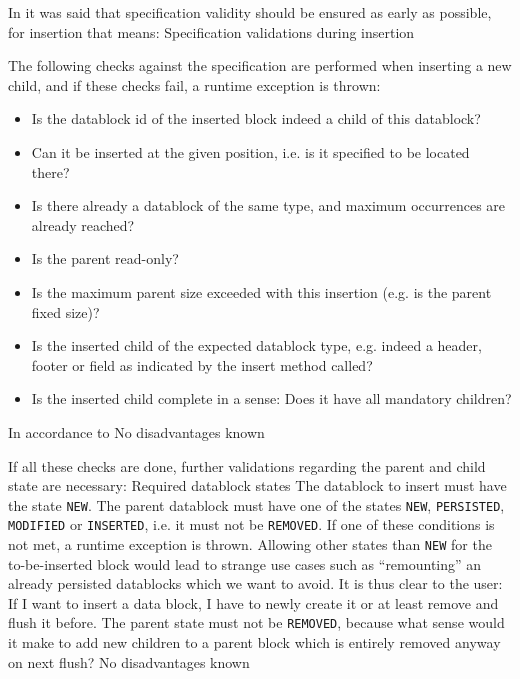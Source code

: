 In  it was said that specification validity should be ensured as early as possible, for insertion that means:
{%
Specification validations during insertion
}
{%
The following checks against the specification are performed when inserting a new child, and if these checks fail, a runtime exception is thrown:
\begin{itemize}
\item Is the datablock id of the inserted block indeed a child of this datablock?
\item Can it be inserted at the given position, i.e. is it specified to be located there?
\item Is there already a datablock of the same type, and maximum occurrences are already reached?
\item Is the parent read-only?
\item Is the maximum parent size exceeded with this insertion (e.g. is the parent fixed size)?
\item Is the inserted child of the expected datablock type, e.g. indeed a header, footer or field as indicated by the insert method called?
\item Is the inserted child complete in a sense: Does it have all mandatory children?
\end{itemize}
}
{%
In accordance to 
}
{%
No disadvantages known
}

If all these checks are done, further validations regarding the parent and child state are necessary:
{%
Required datablock states
}
{%
The datablock to insert must have the state \texttt{NEW}. The parent datablock must have one of the states \texttt{NEW}, \texttt{PERSISTED}, \texttt{MODIFIED} or \texttt{INSERTED}, i.e. it must not be \texttt{REMOVED}. If one of these conditions is not met, a runtime exception is thrown.
}
{%
Allowing other states than \texttt{NEW} for the to-be-inserted block would lead to strange use cases such as ``remounting'' an already persisted datablocks which we want to avoid. It is thus clear to the user: If I want to insert a data block, I have to newly create it or at least remove and flush it before. The parent state must not be \texttt{REMOVED}, because what sense would it make to add new children to a parent block which is entirely removed anyway on next flush?
}
{%
No disadvantages known
}


